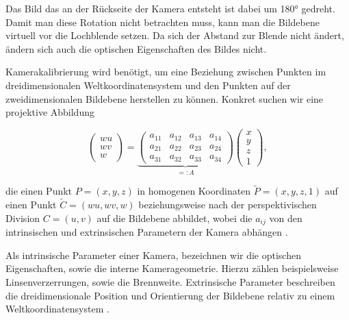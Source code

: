 Das Bild das an der Rückseite der Kamera entsteht ist dabei um 180° gedreht. Damit man diese Rotation nicht betrachten muss, kann man die Bildebene virtuell vor die Lochblende setzen. Da sich der Abstand zur Blende nicht ändert, ändern sich auch die optischen Eigenschaften des Bildes nicht.

Kamerakalibrierung wird benötigt, um eine Beziehung zwischen Punkten im dreidimensionalen Weltkoordinatensystem und den Punkten auf der zweidimensionalen Bildebene herstellen zu können. Konkret suchen wir eine projektive Abbildung

\begin{equation}\label{eq:projectionMat}
	\begin{pmatrix}
	wu \\wv \\w 
	\end{pmatrix} = 
		\underbrace{\begin{pmatrix}
		a_{11} & a_{12} & a_{13} & a_{14} \\
		a_{21} & a_{22} & a_{23} & a_{24} \\
		a_{31} & a_{32} & a_{33} & a_{34} 
		\end{pmatrix}}_{=:A}	\begin{pmatrix}
		x \\y \\z \\ 1 
		\end{pmatrix},
\end{equation}


die einen Punkt $P=(x,y,z)$ in homogenen Koordinaten $\tilde P = (x,y,z,1)$ auf einen Punkt $\tilde C = (wu,wv, w)$ beziehungsweise nach der perspektivischen Division $C = (u,v)$ auf die Bildebene abbildet, wobei die $a_{ij}$ von den intrinsischen und extrinsischen Parametern der Kamera abhängen \cite{Heikkila1997}.

Als intrinsische Parameter einer Kamera, bezeichnen wir die optischen Eigenschaften, sowie die interne Kamerageometrie. Hierzu zählen beispielsweise Linsenverzerrungen, sowie die Brennweite. 
Extrinsische Parameter beschreiben die dreidimensionale Position und Orientierung der Bildebene relativ zu einem Weltkoordinatensystem  \cite{Tsai1987}.

